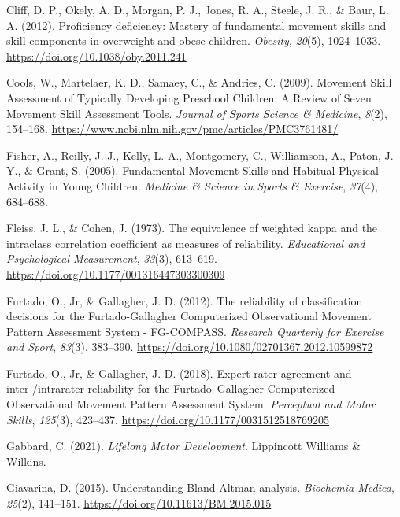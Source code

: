 \documentclass[
  man,
  colorlinks=true,linkcolor=blue,citecolor=blue,urlcolor=blue]{apa7}
\newlength{\cslhangindent}
\newlength{\cslentryspacingunit} %
\newenvironment{CSLReferences}[2] %
 {%
  \setlength{\parindent}{0pt}
  \ifodd #1
  \let\oldpar\par
  \def\par{\hangindent=\cslhangindent\oldpar}
  \fi
  \setlength{\parskip}{#2\cslentryspacingunit}
 }%
 {}
\begin{document}
\begin{CSLReferences}{1}{0}
\leavevmode{}%
Cliff, D. P., Okely, A. D., Morgan, P. J., Jones, R. A., Steele, J. R.,
\& Baur, L. A. (2012). Proficiency deficiency: {Mastery} of fundamental
movement skills and skill components in overweight and obese children.
\emph{Obesity}, \emph{20}(5), 1024--1033.
\url{https://doi.org/10.1038/oby.2011.241}

\leavevmode{}%
Cools, W., Martelaer, K. D., Samaey, C., \& Andries, C. (2009). Movement
{Skill Assessment} of {Typically Developing Preschool Children}: {A
Review} of {Seven Movement Skill Assessment Tools}. \emph{Journal of
Sports Science \& Medicine}, \emph{8}(2), 154--168.
\url{https://www.ncbi.nlm.nih.gov/pmc/articles/PMC3761481/}

\leavevmode{}%
Fisher, A., Reilly, J. J., Kelly, L. A., Montgomery, C., Williamson, A.,
Paton, J. Y., \& Grant, S. (2005). Fundamental {Movement Skills} and
{Habitual Physical Activity} in {Young Children}. \emph{Medicine \&
Science in Sports \& Exercise}, \emph{37}(4), 684--688.

\leavevmode{}%
Fleiss, J. L., \& Cohen, J. (1973). The equivalence of weighted kappa
and the intraclass correlation coefficient as measures of reliability.
\emph{Educational and Psychological Measurement}, \emph{33}(3),
613--619. \url{https://doi.org/10.1177/001316447303300309}

\leavevmode{}%
Furtado, O., Jr, \& Gallagher, J. D. (2012). The reliability of
classification decisions for the {Furtado-Gallagher Computerized
Observational Movement Pattern Assessment System} - {FG-COMPASS}.
\emph{Research Quarterly for Exercise and Sport}, \emph{83}(3),
383--390. \url{https://doi.org/10.1080/02701367.2012.10599872}

\leavevmode{}%
Furtado, O., Jr, \& Gallagher, J. D. (2018). Expert-rater agreement and
inter-/intrarater reliability for the {Furtado}--{Gallagher Computerized
Observational Movement Pattern Assessment System}. \emph{Perceptual and
Motor Skills}, \emph{125}(3), 423--437.
\url{https://doi.org/10.1177/0031512518769205}

\leavevmode{}%
Gabbard, C. (2021). \emph{Lifelong {Motor Development}}. {Lippincott
Williams \& Wilkins}.

\leavevmode{}%
Giavarina, D. (2015). Understanding {Bland Altman} analysis.
\emph{Biochemia Medica}, \emph{25}(2), 141--151.
\url{https://doi.org/10.11613/BM.2015.015}


\end{CSLReferences}
\end{document}
